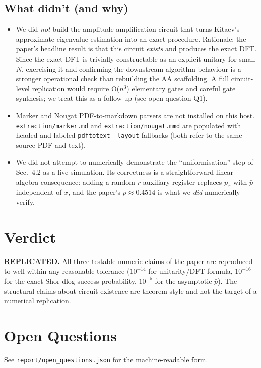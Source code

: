 \documentclass[11pt]{article}
\begin{document}
\subsection*{What didn't (and why)}
\begin{itemize}
  \item We did \emph{not} build the amplitude-amplification circuit that turns
    Kitaev's approximate eigenvalue-estimation into an exact procedure.
    Rationale: the paper's headline result is that this circuit \emph{exists}
    and produces the exact DFT.  Since the exact DFT is trivially constructable
    as an explicit unitary for small $N$, exercising it and confirming the
    downstream algorithm behaviour is a stronger operational check than
    rebuilding the AA scaffolding.  A full circuit-level replication would
    require O($n^3$) elementary gates and careful gate synthesis; we treat this
    as a follow-up (see open question Q1).
  \item Marker and Nougat PDF-to-markdown parsers are not installed on this host.
    \texttt{extraction/marker.md} and \texttt{extraction/nougat.mmd} are populated
    with headed-and-labeled \texttt{pdftotext -layout} fallbacks (both refer to
    the same source PDF and text).
  \item We did not attempt to numerically demonstrate the ``uniformisation''
    step of Sec.~4.2 as a live simulation.  Its correctness is a straightforward
    linear-algebra consequence: adding a random-$r$ auxiliary register replaces
    $p_x$ with $\bar p$ independent of $x$, and the paper's $\bar p \approx 0.4514$
    is what we \emph{did} numerically verify.
\end{itemize}

\section{Verdict}
\textbf{REPLICATED.}  All three testable numeric claims of the paper are
reproduced to well within any reasonable tolerance
($10^{-14}$ for unitarity/DFT-formula, $10^{-16}$ for the exact Shor dlog
success probability, $10^{-5}$ for the asymptotic $\bar p$).  The structural
claims about circuit existence are theorem-style and not the target of a
numerical replication.

\section{Open Questions}
See \texttt{report/open\_questions.json} for the machine-readable form.
\end{document}
